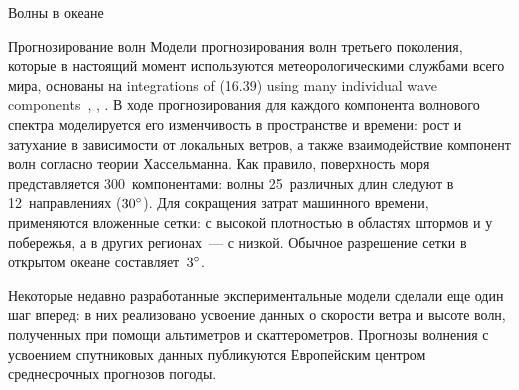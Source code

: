 \begin{chapter}{Волны в океане}
\begin{section}{Прогнозирование волн}
Модели прогнозирования волн третьего поколения, которые в настоящий момент
используются метеорологическими службами всего мира, основаны на
integrations of (16.39) using many individual wave 
components~\cite{SWAMP:1985}, \cite{WAMDI:1988}, \cite{Komen:1996}. 
В ходе прогнозирования для каждого компонента волнового спектра 
моделируется его изменчивость в пространстве и времени: рост и затухание
в зависимости от локальных ветров, а также взаимодействие компонент волн
согласно теории Хассельманна. Как правило, поверхность моря представляется
300~компонентами: волны 25~различных длин следуют в 12~направлениях 
(${30}^\circ$). Для сокращения затрат машинного времени, применяются
вложенные сетки: с высокой плотностью в областях штормов и у побережья,
а в других регионах~--- с низкой. Обычное разрешение сетки в открытом
океане составляет~${3}^\circ$.
%

Некоторые недавно разработанные экспериментальные модели сделали еще один
шаг вперед: в них реализовано усвоение данных о скорости ветра и высоте волн,
полученных при помощи альтиметров и 
скаттерометров.
Прогнозы волнения с усвоением спутниковых данных публикуются Европейским
центром среднесрочных прогнозов погоды.
%


\end{section}
\end{chapter}
